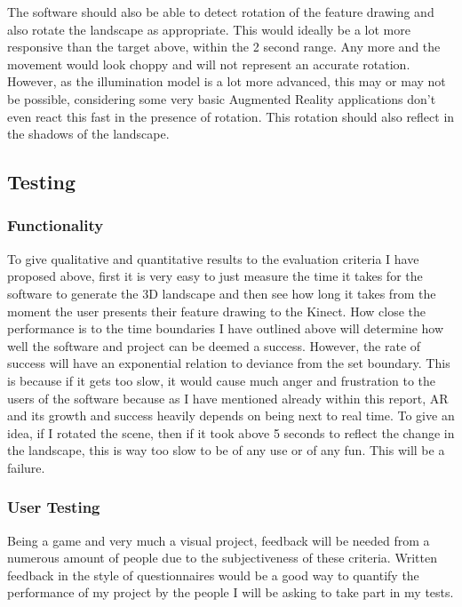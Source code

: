 \documentclass[11pt]{report}
\begin{document}
The software should also be able to detect rotation of the feature drawing
and also rotate the landscape as appropriate. This would ideally be a lot more
responsive than the target above, within the 2 second range. Any more and the
movement would look choppy and will not represent an accurate rotation. However,
as the illumination model is a lot more advanced, this may or may not be 
possible, considering some very basic Augmented Reality applications don't even
react this fast in the presence of rotation. This rotation should also reflect in 
the shadows of the landscape.

\subsection*{Testing}
\subsubsection*{Functionality}
To give qualitative and quantitative results to the evaluation criteria I have 
proposed above, first it is very easy to just measure the time it takes for the
software to generate the 3D landscape and then see how long it takes from
the moment the user presents their feature drawing to the Kinect. How close the
performance is to the time boundaries I have outlined above will determine how
well the software and project can be deemed a success. However, the rate of
success will have an exponential relation to deviance from the set boundary.
This is because if it gets too slow, it would cause much anger and frustration 
to the users of the software because as I have mentioned already within this 
report, AR and its growth and success heavily depends on being next to real time.
To give an idea, if I rotated the scene, then if it took above 5 seconds to reflect
the change in the landscape, this is way too slow to be of any use or of any fun.
This will be a failure.

\subsubsection*{User Testing}
Being a game and very much a visual project, feedback will be needed from a 
numerous amount of people due to the subjectiveness of these criteria. 
Written feedback in the style of questionnaires would be a good way to
quantify the performance of my project by the people I will be asking to take
part in my tests. 
\end{document}
